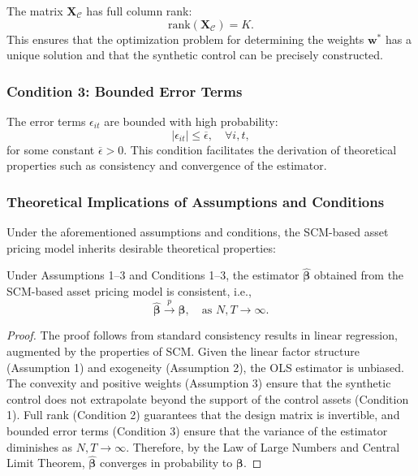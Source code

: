 The matrix $\mathbf{X}_{\mathcal{C}}$ has full column rank:
\[
\text{rank}(\mathbf{X}_{\mathcal{C}}) = K.
\]
This ensures that the optimization problem for determining the weights $\mathbf{w}^*$ has a unique solution and that the synthetic control can be precisely constructed.

\subsubsection{Condition 3: Bounded Error Terms}

The error terms $\epsilon_{it}$ are bounded with high probability:
\[
|\epsilon_{it}| \leq \overline{\epsilon}, \quad \forall i, t,
\]
for some constant $\overline{\epsilon} > 0$. This condition facilitates the derivation of theoretical properties such as consistency and convergence of the estimator.

\subsubsection{Theoretical Implications of Assumptions and Conditions}

Under the aforementioned assumptions and conditions, the SCM-based asset pricing model inherits desirable theoretical properties:

\begin{theorem}
\label{thm:consistency_beta}
Under Assumptions 1--3 and Conditions 1--3, the estimator $\hat{\boldsymbol{\beta}}$ obtained from the SCM-based asset pricing model is consistent, i.e.,
\[
\hat{\boldsymbol{\beta}} \xrightarrow{p} \boldsymbol{\beta}, \quad \text{as } N, T \rightarrow \infty.
\]
\end{theorem}

\begin{proof}
The proof follows from standard consistency results in linear regression, augmented by the properties of SCM. Given the linear factor structure (Assumption 1) and exogeneity (Assumption 2), the OLS estimator is unbiased. The convexity and positive weights (Assumption 3) ensure that the synthetic control does not extrapolate beyond the support of the control assets (Condition 1). Full rank (Condition 2) guarantees that the design matrix is invertible, and bounded error terms (Condition 3) ensure that the variance of the estimator diminishes as $N, T \rightarrow \infty$. Therefore, by the Law of Large Numbers and Central Limit Theorem, $\hat{\boldsymbol{\beta}}$ converges in probability to $\boldsymbol{\beta}$.
\end{proof}

